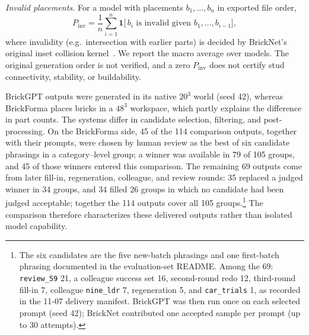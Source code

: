 \documentclass[letterpaper]{article} %
\begin{document}
\emph{Invalid placements.} For a model with placements $b_1,\ldots,b_n$ in exported file order,
\begin{equation}
P_{\mathrm{inv}} = \frac{1}{n}\sum_{i=1}^{n}\mathbf{1}\big[\,b_i \text{ is invalid given } b_1,\ldots,b_{i-1}\big],
\end{equation}
where invalidity (e.g.\ intersection with earlier parts) is decided by BrickNet's original inset collision kernel~\cite{bricknet}. We report the macro average over models. The original generation order is not verified, and a zero $P_{\mathrm{inv}}$ does not certify stud connectivity, stability, or buildability.

BrickGPT outputs were generated in its native $20^3$ world (seed 42), whereas BrickForma places bricks in a $48^3$ workspace, which partly explains the difference in part counts.
The systems differ in candidate selection, filtering, and post-processing.
On the BrickForma side, 45 of the 114 comparison outputs, together with their prompts, were chosen by human review as the best of six candidate phrasings in a category--level group; a winner was available in 79 of 105 groups, and 45 of those winners entered this comparison.
The remaining 69 outputs come from later fill-in, regeneration, colleague, and review rounds: 35 replaced a judged winner in 34 groups, and 34 filled 26 groups in which no candidate had been judged acceptable; together the 114 outputs cover all 105 groups.\footnote{The six candidates are the five new-batch phrasings and one first-batch phrasing documented in the evaluation-set README. Among the 69: \texttt{review\_59} 21, a colleague success set 16, second-round redo 12, third-round fill-in 7, colleague \texttt{nine\_ldr} 7, regeneration 5, and \texttt{car\_trials} 1, as recorded in the 11-07 delivery manifest. BrickGPT was then run once on each selected prompt (seed 42); BrickNet contributed one accepted sample per prompt (up to 30 attempts).}
The comparison therefore characterizes these delivered outputs rather than isolated model capability.
\end{document}
